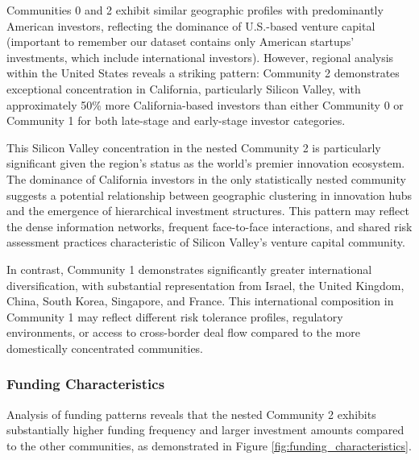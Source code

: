 
Communities 0 and 2 exhibit similar geographic profiles with predominantly American investors, reflecting the dominance of U.S.-based venture capital (important to remember our dataset contains only American startups' investments, which include international investors). However, regional analysis within the United States reveals a striking pattern: Community 2 demonstrates exceptional concentration in California, particularly Silicon Valley, with approximately 50\% more California-based investors than either Community 0 or Community 1 for both late-stage and early-stage investor categories.

This Silicon Valley concentration in the nested Community 2 is particularly significant given the region's status as the world's premier innovation ecosystem. The dominance of California investors in the only statistically nested community suggests a potential relationship between geographic clustering in innovation hubs and the emergence of hierarchical investment structures. This pattern may reflect the dense information networks, frequent face-to-face interactions, and shared risk assessment practices characteristic of Silicon Valley's venture capital community.

In contrast, Community 1 demonstrates significantly greater international diversification, with substantial representation from Israel, the United Kingdom, China, South Korea, Singapore, and France. This international composition in Community 1 may reflect different risk tolerance profiles, regulatory environments, or access to cross-border deal flow compared to the more domestically concentrated communities.

\subsubsection{Funding Characteristics}

Analysis of funding patterns reveals that the nested Community 2 exhibits substantially higher funding frequency and larger investment amounts compared to the other communities, as demonstrated in Figure \ref{fig:funding_characteristics}.

